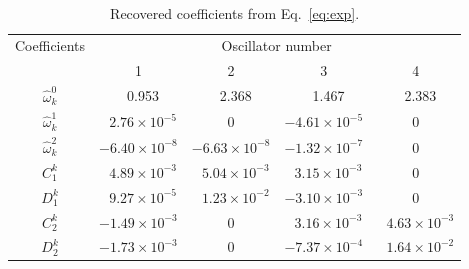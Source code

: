 \documentclass[12pt]{article}
\theoremstyle{plain}
\theoremstyle{definition}
\theoremstyle{remark}
\theoremstyle{remark}
\begin{document}
~\\
\begin{center}
\begin{table}
\caption{Recovered coefficients from Eq.~\ref{eq:exp}.}
\begin{tabular}{ c|cccc}
\hline
 Coefficients & \multicolumn{4}{|c}{Oscillator number} \\
 & 1 & 2 & 3 & 4 \\
\hline
\hline
$\hat{\omega}_k^0$ & \,\,\,\,0.953 & \,\,\,\,2.368 & \,\,\,\,1.467 & \,\,\,\,2.383 \\
$\hat{\omega}_k^1$ & \,\,\,\,$2.76\times 10^{-5} $ & 0 & $-4.61\times 10^{-5}$ & 0 \\
$\hat{\omega}_k^2$ & $-6.40\times 10^{-8}$ & $-6.63\times 10^{-8}$ & $-1.32\times 10^{-7}$ & 0 \\
$C_1^k$ & \,\,\,\,$4.89\times 10^{-3}$ & \,\,\,\,$5.04\times 10^{-3}$ & $\,\,\,\,3.15\times 10^{-3}$ & 0 \\
$D_1^k$ & \,\,\,\,$9.27\times 10^{-5}$ & \,\,\,\,$1.23\times 10^{-2}$ & $-3.10\times 10^{-3}$ & 0 \\
$C_2^k$ & $-1.49\times 10^{-3}$ & 0 & \,\,\,\,$3.16\times 10^{-3}$ & \,\,\,\,$4.63\times 10^{-3}$  \\
$D_2^k$ & $-1.73\times 10^{-3}$ & 0 & $-7.37\times 10^{-4}$ & \,\,\,\,$1.64\times 10^{-2}$ \\
\hline
\end{tabular}
\end{table}
\end{center}

~\\
\end{document}
